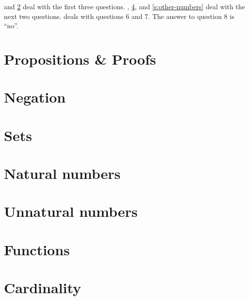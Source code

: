  and \cref{s:negation} deal with the first three
questions. , \cref{s:nats}, and \cref{s:other-numbers}
deal with the next two questions.  deals with
questions 6 and 7. The answer to question 8 is ``no''.

\section{Propositions \& Proofs}
\label{s:props-proofs}

\section{Negation}
\label{s:negation}

\section{Sets}
\label{s:sets}

\section{Natural numbers}
\label{s:nats}
\label{s:induction}

\section{Unnatural numbers}
\label{s:unnats}
\label{s:other-numbers}

\section{Functions}
\label{s:functions}

\section{Cardinality}
\label{s:cardinality}
